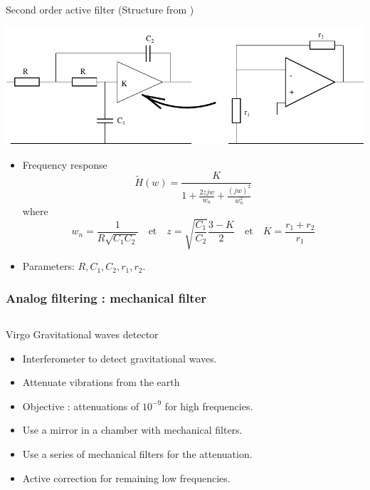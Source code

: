 \begin{block}{Second order active filter (Structure from \cite{sallen1955practical}) }
\vspace{-5mm}
  \begin{center}
\includegraphics[width=.8\columnwidth]{imgs/fourier/filtrage_actif_2o}
\end{center}
\vspace{-5mm}
\begin{itemize}
\item Frequency response
$$\tilde H(w)=\frac{K}{1+\frac{2zjw}{w_n}+\frac{(jw)^2}{w_n^2}}$$\vspace{-5mm}
where \pause
$$ w_n=\frac{1}{R\sqrt{C_1C_2}}\quad \text{et} \quad
z=\sqrt{\frac{C_1}{C_2}} \frac{3-K}{2}\quad \text{et} \quad  K=\frac{r_1+r_2}{r_1}$$

\item Parameters: $R, C_1,C_2,r_1,r_2$.

\end{itemize}
\end{block}

\frametitle{Analog filtering : mechanical filter}


\begin{columns}[T]
  \begin{column}
    \begin{block}{Virgo Gravitational waves detector \cite{acernese2014advanced}}
      \begin{itemize}
        \item Interferometer to detect gravitational waves.
        \item Attenuate vibrations from the earth \cite{braccini1996seismic}
        \item Objective : attenuations of $10^{-9}$ for high frequencies. 
        \item Use a mirror in  a chamber with mechanical filters.
        \item Use a series of mechanical filters for the attenuation.
        \item Active correction for remaining low frequencies.
      \end{itemize}
    \end{block}
  \end{column}\hspace{-1cm}

\end{columns}


